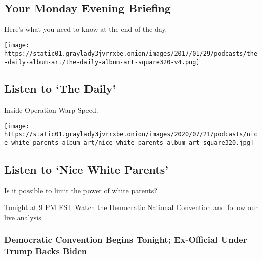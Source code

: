 \href{/2020/08/17/briefing/democrats-postal-service-rage-moms.html}{}

\hypertarget{your-monday-evening-briefing}{%
\subsection{Your Monday Evening
Briefing}\label{your-monday-evening-briefing}}

Here's what you need to know at the end of the day.

\href{/2020/08/17/podcasts/the-daily/trump-coronavirus-vaccine-covid.html}{}

\texttt{[image: https://static01.graylady3jvrrxbe.onion/images/2017/01/29/podcasts/the-daily-album-art/the-daily-album-art-square320-v4.png]}

\href{/2020/08/17/podcasts/the-daily/trump-coronavirus-vaccine-covid.html}{}

\hypertarget{listen-to-the-daily}{%
\subsection{Listen to `The Daily'}\label{listen-to-the-daily}}

Inside Operation Warp Speed.

\href{/2020/08/13/podcasts/nice-white-parents-school.html}{}

\texttt{[image: https://static01.graylady3jvrrxbe.onion/images/2020/07/21/podcasts/nice-white-parents-album-art/nice-white-parents-album-art-square320.jpg]}

\href{/2020/08/13/podcasts/nice-white-parents-school.html}{}

\hypertarget{listen-to-nice-white-parents}{%
\subsection{Listen to `Nice White
Parents'}\label{listen-to-nice-white-parents}}

Is it possible to limit the power of white parents?

\href{https://www.nytimes3xbfgragh.onion/live/2020/08/17/us/dnc-convention}{}

Tonight at 9 PM EST Watch the Democratic National Convention and follow
our live analysis.

\href{https://www.nytimes3xbfgragh.onion/live/2020/08/17/us/dnc-convention}{}

\hypertarget{democratic-convention-begins-tonight-ex-official-under-trump-backs-biden}{%
\subsubsection{Democratic Convention Begins Tonight; Ex-Official Under
Trump Backs
Biden}\label{democratic-convention-begins-tonight-ex-official-under-trump-backs-biden}}

